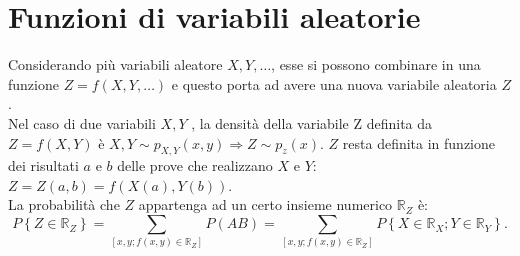 \chapter{Funzioni di variabili aleatorie} %
Considerando più variabili aleatore $X,Y,\dots$, esse si possono combinare in una funzione $Z=f(X,Y,\dots)$ e questo porta ad avere una nuova variabile aleatoria $Z$. \\ Nel caso di due variabili $X,Y$ , la densità della variabile Z definita da $Z=f(X,Y)$ è $X,Y \sim p_{X,Y}(x,y) \Longrightarrow Z \sim p_{z}(x)$. $Z$ resta definita in funzione dei risultati $a$ e $b$ delle prove che realizzano $X$ e $Y$: $Z=Z(a,b)=f(X(a),Y(b))$. \\ La probabilità che $Z$ appartenga ad un certo insieme numerico $\mathbb{R}_Z$ è:
\begin{equation}
P\left\{ Z\in \mathbb{ R }_{ Z } \right\} =\sum _{ \left[ x,y;f\left( x,y \right) \in \mathbb{ R }_{ Z } \right]  }{ P\left( AB \right)  } =\sum _{ \left[ x,y;f\left( x,y \right) \in \mathbb{ R }_{ Z } \right]  }{ P\left\{ X\in \mathbb{ R }_{ X }; Y\in \mathbb{ R }_{ Y } \right\}  } .
\end{equation}

